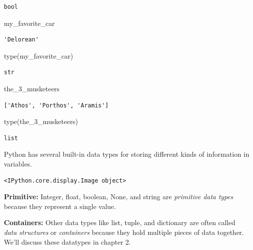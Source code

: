 \documentclass[
  letterpaper,
  DIV=11,
  numbers=noendperiod]{scrreprt}
\newenvironment{Shaded}{\begin{snugshade}}{\end{snugshade}}
\newcommand{\BuiltInTok}[1]{\textcolor[rgb]{0.00,0.23,0.31}{#1}}
\newcommand{\NormalTok}[1]{\textcolor[rgb]{0.00,0.23,0.31}{#1}}
\begin{document}
\begin{verbatim}
bool
\end{verbatim}

\begin{Shaded}
\begin{Highlighting}[]
\NormalTok{my\_favorite\_car}
\end{Highlighting}
\end{Shaded}

\begin{verbatim}
'Delorean'
\end{verbatim}

\begin{Shaded}
\begin{Highlighting}[]
\BuiltInTok{type}\NormalTok{(my\_favorite\_car)}
\end{Highlighting}
\end{Shaded}

\begin{verbatim}
str
\end{verbatim}

\begin{Shaded}
\begin{Highlighting}[]
\NormalTok{the\_3\_musketeers}
\end{Highlighting}
\end{Shaded}

\begin{verbatim}
['Athos', 'Porthos', 'Aramis']
\end{verbatim}

\begin{Shaded}
\begin{Highlighting}[]
\BuiltInTok{type}\NormalTok{(the\_3\_musketeers)}
\end{Highlighting}
\end{Shaded}

\begin{verbatim}
list
\end{verbatim}

Python has several built-in data types for storing different kinds of
information in variables.

\begin{verbatim}
<IPython.core.display.Image object>
\end{verbatim}

\textbf{Primitive:} Integer, float, boolean, None, and string are
\emph{primitive data types} because they represent a single value.

\textbf{Containers:} Other data types like list, tuple, and dictionary
are often called \emph{data structures} or \emph{containers} because
they hold multiple pieces of data together. We'll discuss these
datatypes in chapter 2.
\end{document}
